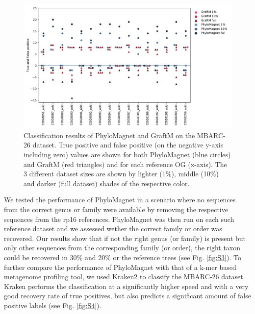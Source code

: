 \documentclass[a4paper]{article}
\begin{document}
\begin{figure}[!tpb]%
\centerline{\includegraphics[width=.7\textwidth]{Fig2.pdf}}
\caption{Classification results of PhyloMagnet and GraftM on the MBARC-26 dataset. True positive and false positive (on the negative y-axis including zero) values are shown for both PhyloMagnet (blue circles) and GraftM (red triangles) and for each reference OG (x-axis). The 3 different dataset sizes are shown by lighter (1\%), middle (10\%) and darker (full dataset) shades of the respective color.} \label{fig:02}
\end{figure}

We tested the performance of PhyloMagnet in a scenario where no sequences from the correct genus or family were available by removing the respective sequences from the rp16 references. PhyloMagnet was then run on each such reference dataset and we assessed wether the correct family or order was recovered. Our results show that if not the right genus (or family) is present but only other sequences from the corresponding family (or order), the right taxon could be recovered in 30\% and 20\% or the reference trees (see Fig. \ref{fig:S3}).
To further compare the performance of PhyloMagnet with that of a k-mer based metagenome profiling tool, we used Kraken2 \citep{Wood2014,Wood2019} to classify the MBARC-26 dataset. Kraken performs the classification at a significantly higher speed and with a very good recovery rate of true positives, but also predicts a significant amount of false positive labels (see Fig. \ref{fig:S4}). 
\end{document}
